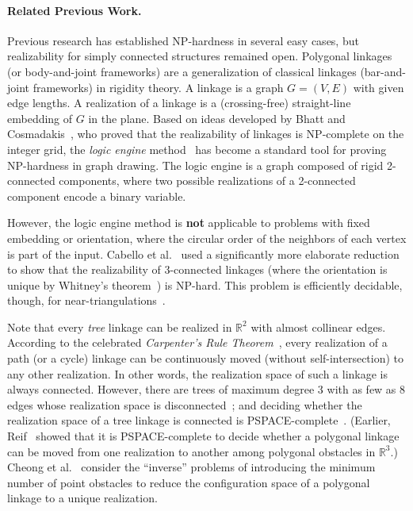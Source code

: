 \documentclass{article}
\theoremstyle{plain}%
\newcommand{\RR}{\mathbb{R}} %
\begin{document}
\paragraph{Related Previous Work.}
Previous research has established NP-hardness in several easy cases, but realizability for simply connected structures remained open. Polygonal linkages (or body-and-joint frameworks) are a generalization of classical linkages (bar-and-joint frameworks) in rigidity theory. A linkage is a graph $G=(V,E)$ with given edge lengths. A realization of a linkage is a (crossing-free) straight-line embedding of $G$ in the plane. Based on ideas developed by Bhatt and Cosmadakis~\cite{BC87}, who proved that the realizability of linkages is NP-complete on the integer grid, the \emph{logic engine} method~\cite{BET+99,EW96,FHW97,HK01} has become a standard tool for proving NP-hardness in graph drawing. The logic engine is a graph composed of rigid 2-connected components, where two possible realizations of a 2-connected component encode a binary variable.

However, the logic engine method is \textbf{not} applicable to problems with fixed embedding or orientation, where the circular order of the neighbors of each vertex is part of the input. Cabello et al.~\cite{CDR07,EW90} used a significantly more elaborate reduction to show that the realizability of 3-connected linkages (where the orientation is unique by Whitney's theorem~\cite{W33}) is NP-hard. This problem is efficiently decidable, though, for near-triangulations~\cite{CDR07,BV96}.

Note that every \emph{tree} linkage can be realized in $\RR^2$ with almost collinear edges. According to the celebrated \emph{Carpenter's Rule Theorem}~\cite{CDR03,Str05}, every realization of a path (or a cycle) linkage can be continuously moved (without self-intersection) to any other realization. In other words, the realization space of such a linkage is always connected. However, there are trees of maximum degree 3 with as few as 8 edges whose realization space is disconnected~\cite{BCD+09}; and deciding whether the realization space of a tree linkage is connected is PSPACE-complete~\cite{AKR+04}.
(Earlier, Reif~\cite{Rei79} showed that it is PSPACE-complete to decide whether a polygonal linkage can be moved from one realization to another among polygonal obstacles in $\RR^3$.)
Cheong et al.~\cite{CdG+07} consider the ``inverse'' problems of introducing the minimum number of point obstacles to reduce the configuration space of a polygonal linkage to a unique realization.
\end{document}
